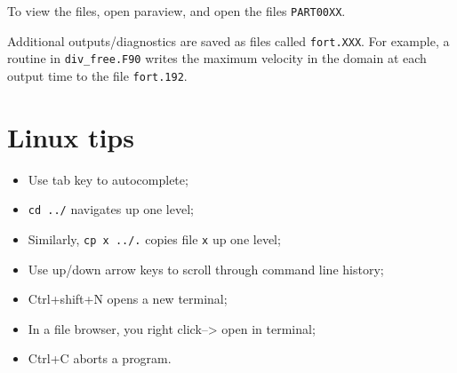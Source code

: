 \documentclass[notitlepage]{revtex4-2}
\begin{document}
To view the files, open paraview, and open the files \verb|PART00XX|.

Additional outputs/diagnostics are saved as files called \verb|fort.XXX|. For example, a routine in \verb|div_free.F90| writes the maximum velocity in the domain at each output time to the file \verb|fort.192|.

\section{Linux tips}
\begin{itemize}
\item Use tab key to autocomplete;
\item \verb|cd ../| navigates up one level;
\item Similarly, \verb|cp x ../.| copies file \verb|x| up one level;
\item Use up/down arrow keys to scroll through command line history;
\item Ctrl+shift+N opens a new terminal;
\item In a file browser, you right click--> open in terminal;
\item Ctrl+C aborts a program.
\end{itemize}




\end{document}
